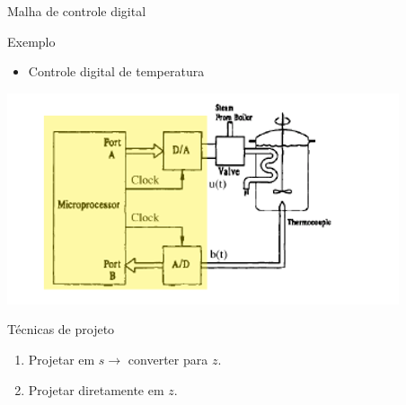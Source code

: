 \begin{frame}{Malha de controle digital}

\begin{block}{Exemplo}
\begin{itemize}
    \item Controle digital de temperatura
\end{itemize}
\end{block}

\centerline{\includegraphics[width=0.9\linewidth]{Figuras/Ch01/fig1.png}}

\end{frame}

\begin{frame}{Técnicas de projeto}
\begin{block}{}
\begin{enumerate}
\item Projetar em $ s \rightarrow $ converter para $ z $.
\item Projetar diretamente em $ z $.
\end{enumerate}
\end{block}
	
	
\end{frame}

